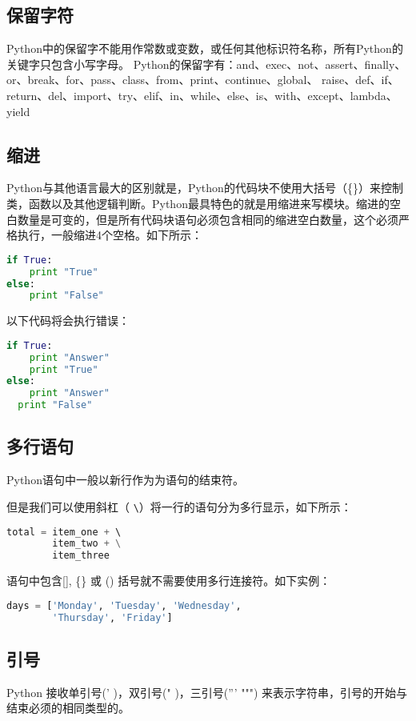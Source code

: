 \subsection{保留字符}
Python中的保留字不能用作常数或变数，或任何其他标识符名称，所有Python的关键字只包含小写字母。
Python的保留字有：and、exec、not、assert、finally、or、break、for、pass、class、from、print、continue、global、
raise、def、if、return、del、import、try、elif、in、while、else、is、with、except、lambda、	yield




\subsection{缩进}
Python与其他语言最大的区别就是，Python的代码块不使用大括号（\{\}）来控制类，函数以及其他逻辑判断。Python最具特色的就是用缩进来写模块。缩进的空白数量是可变的，但是所有代码块语句必须包含相同的缩进空白数量，这个必须严格执行，一般缩进4个空格。如下所示：
\begin{lstlisting}[language=Python]
if True:
    print "True"
else:
    print "False"
\end{lstlisting}
以下代码将会执行错误：
\begin{lstlisting}[language=Python]
     if True:
    print "Answer"
    print "True"
else:
    print "Answer"
  print "False"
\end{lstlisting}



\subsection{多行语句}
Python语句中一般以新行作为为语句的结束符。

但是我们可以使用斜杠（ \verb|\|）将一行的语句分为多行显示，如下所示：
\begin{lstlisting}[language=Python]
 total = item_one + \ 
        item_two + \
        item_three
\end{lstlisting}

语句中包含[], \{\} 或 () 括号就不需要使用多行连接符。如下实例：
\begin{lstlisting}[language=Python]
days = ['Monday', 'Tuesday', 'Wednesday',
        'Thursday', 'Friday']
\end{lstlisting}



\subsection{引号}
Python 接收单引号(' )，双引号(" )，三引号(''' """) 来表示字符串，引号的开始与结束必须的相同类型的。

